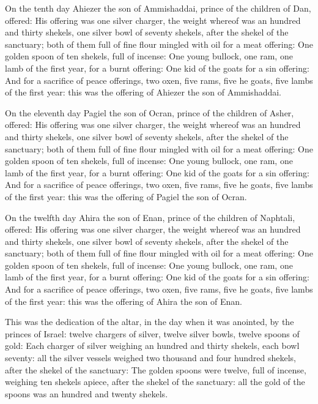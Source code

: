 \verse On the tenth day Ahiezer the son of Ammishaddai, prince of the
children of Dan, offered: \verse His offering was one silver charger,
the weight whereof was an hundred and thirty shekels, one silver bowl
of seventy shekels, after the shekel of the sanctuary; both of them
full of fine flour mingled with oil for a meat offering: \verse One
golden spoon of ten shekels, full of incense: \verse One young bullock,
one ram, one lamb of the first year, for a burnt offering: \verse One
kid of the goats for a sin offering: \verse And for a sacrifice of peace
offerings, two oxen, five rams, five he goats, five lambs of the first
year: this was the offering of Ahiezer the son of Ammishaddai.

\verse On the eleventh day Pagiel the son of Ocran, prince of the
children of Asher, offered: \verse His offering was one silver charger,
the weight whereof was an hundred and thirty shekels, one silver bowl
of seventy shekels, after the shekel of the sanctuary; both of them
full of fine flour mingled with oil for a meat offering: \verse One
golden spoon of ten shekels, full of incense: \verse One young bullock,
one ram, one lamb of the first year, for a burnt offering: \verse One
kid of the goats for a sin offering: \verse And for a sacrifice of peace
offerings, two oxen, five rams, five he goats, five lambs of the first
year: this was the offering of Pagiel the son of Ocran.

\verse On the twelfth day Ahira the son of Enan, prince of the children
of Naphtali, offered: \verse His offering was one silver charger, the
weight whereof was an hundred and thirty shekels, one silver bowl of
seventy shekels, after the shekel of the sanctuary; both of them full
of fine flour mingled with oil for a meat offering: \verse One golden
spoon of ten shekels, full of incense: \verse One young bullock, one
ram, one lamb of the first year, for a burnt offering: \verse One kid of
the goats for a sin offering: \verse And for a sacrifice of peace
offerings, two oxen, five rams, five he goats, five lambs of the first
year: this was the offering of Ahira the son of Enan.

\verse This was the dedication of the altar, in the day when it was
anointed, by the princes of Israel: twelve chargers of silver, twelve
silver bowls, twelve spoons of gold: \verse Each charger of silver
weighing an hundred and thirty shekels, each bowl seventy: all the
silver vessels weighed two thousand and four hundred shekels, after
the shekel of the sanctuary: \verse The golden spoons were twelve, full
of incense, weighing ten shekels apiece, after the shekel of the
sanctuary: all the gold of the spoons was an hundred and twenty
shekels.

